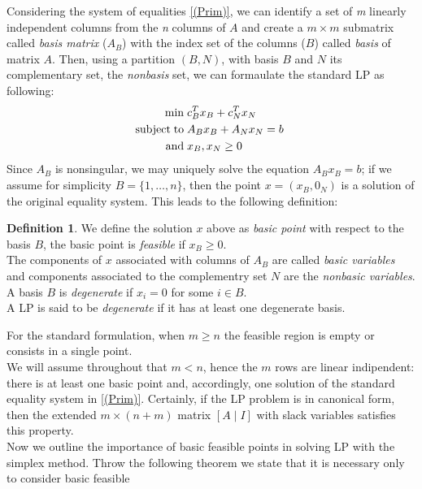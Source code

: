 \documentclass[a4paper,10 pt,titlepage,twoside]{book}
\theoremstyle{plain}
\theoremstyle{definition}
\newtheorem{defn}[thm]{Definition}
\theoremstyle{remark}
\begin{document}
Considering the system of equalities \ref{(Prim)}, we can identify a set of \textit{m} linearly independent columns from the \textit{n} columns of  $A$ and create a $m \times m$ submatrix called \textit{basis matrix} ($A_{B}$) with the index set of the columns ($B$) called \textit{basis} of matrix $A$. Then, using a partition $(B, N)$, with basis $B$ and $N$ its complementary set, the \textit{nonbasis} set, we can formaulate the standard LP as following:
\begin{equation}\label{(Prim1)}
\begin{split}
\min\;&c_{B}^{T}x_{B}+c_{N}^{T}x_{N}\\
\text{subject\;to\;}&A_{B}x_{B}+A_{N}x_{N}= b\;\\\text{and\;}&x_{B},x_{N}\geq0
\end{split}
\end{equation}
Since $A_{B}$ is nonsingular, we may uniquely solve the equation $A_{B}x_{B} = b$; if we assume for simplicity $B = \{1, \dots, n\}$, then the point $x =\left(x_{B},0_{N}\right)$ is a solution of the original equality system. This leads to the following definition:
\begin{defn}

	We define the solution $x$ above as \textit{basic point} with respect to the basis $B$, the basic point is \textit{feasible} if $x_{B}\geq 0$. \\The components of $x$ associated with columns of $A_{B}$ are called \textit{basic variables} and components associated to the complementry set $N$ are the \textit{nonbasic variables}.\\
	A basis $B$ is \textit{degenerate} if $x_{i}= 0$ for some $i\in B$.\\
	A LP is said to be \textit{degenerate} if it has at least one degenerate basis.
\end{defn}
For the standard formulation, when $m \geq n$ the feasible region is empty or consists in a single point.\\
 We will assume throughout that $m < n$, hence the $m$ rows are linear indipendent: there is at least one basic point and, accordingly, one solution of the standard equality system in \ref{(Prim)}. Certainly, if the LP problem is in canonical form, then the extended $m \times (n+m)$ matrix $[A\;|\;I]$ with slack variables satisfies this property. \\
Now we outline the importance of basic feasible points in solving LP with the simplex method.
Throw the following theorem we state that it is necessary only to consider basic feasible
\end{document}

